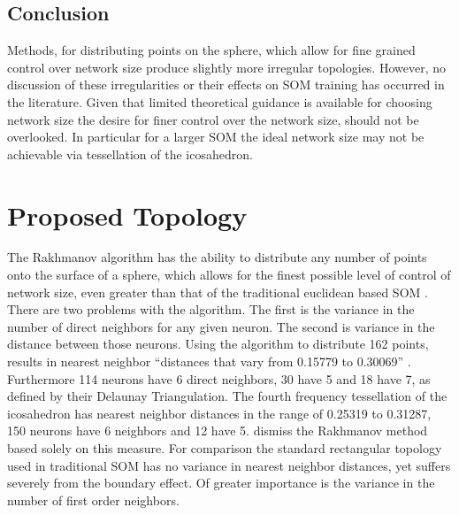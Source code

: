 \documentclass[11pt]{article}
\begin{document}
\subsection{Conclusion}
Methods, for distributing points on the sphere, which allow for fine grained
control over network size produce slightly more irregular topologies.  However,
no discussion of these irregularities or their effects on SOM training has
occurred in the literature. Given that limited theoretical guidance is available
for choosing network size the desire for finer control over the network size,
should not be overlooked. In particular for a larger SOM the ideal network size
may not be achievable via tessellation of the icosahedron.

\section{Proposed Topology}
The Rakhmanov algorithm has the ability to distribute any number of points onto
the surface of a sphere, which allows for the finest possible level of control
of network size, even greater than that of the traditional euclidean based SOM
\citep{Rakhmanov94}.  There are two problems with the \citeauthor{Rakhmanov94}
algorithm. The first is the variance in the number of direct neighbors for any
given neuron.  The second is variance in the distance between those neurons.
Using the algorithm to distribute 162 points, results in nearest neighbor
``distances that vary from 0.15779 to 0.30069'' \cite[pg 3]{wu2005}.
Furthermore 114 neurons have 6 direct neighbors, 30 have 5 and 18 have 7, as
defined by their Delaunay Triangulation.  The fourth frequency tessellation of
the icosahedron has nearest neighbor distances in the range of 0.25319 to
0.31287, 150 neurons have 6 neighbors and 12 have 5.  \cite{wu2005} dismiss the
Rakhmanov method based solely on this measure.  For comparison the standard
rectangular topology used in traditional SOM has no variance in nearest neighbor
distances, yet suffers severely from the boundary effect.  Of greater importance is the
variance in the number of first order neighbors.
\end{document}
